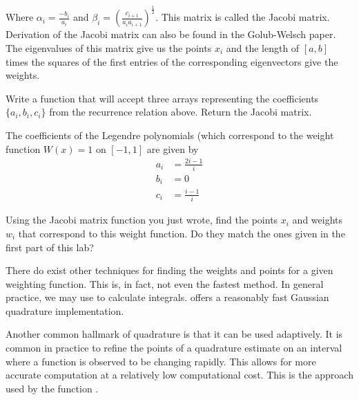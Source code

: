 Where $\alpha_i = \frac{-b_i}{a_i}$ and $\beta_i = (\frac{c_{i+1}}{a_ia_{i+1}})^{\frac{1}{2}}$.
This matrix is called the Jacobi matrix.
Derivation of the Jacobi matrix can also be found in the Golub-Welsch paper.
The eigenvalues of this matrix give us the points $x_i$ and the length of $\left[a, b\right]$ times the squares of the first entries of the corresponding eigenvectors give the weights.

\begin{problem}
Write a function that will accept three arrays representing the coefficients $\{a_i, b_i, c_i\}$ from the recurrence relation above.
Return the Jacobi matrix.
\end{problem}

\begin{problem}
The coefficients of the Legendre polynomials (which correspond to the weight function $W(x) = 1$ on $[-1,1]$ are given by
\begin{align*}
a_i &= \frac{2i - 1}{i} \\
b_i &= 0 \\
c_i &= \frac{i-1}{i}
\end{align*}

Using the Jacobi matrix function you just wrote, find the points $x_i$ and weights $w_i$ that correspond to this weight function.
Do they match the ones given in the first part of this lab?

\end{problem}


There do exist other techniques for finding the weights and points for a given weighting function.
This is, in fact, not even the fastest method.
In general practice, we may use  to calculate integrals.
 offers a reasonably fast Gaussian quadrature implementation.

Another common hallmark of quadrature is that it can be used adaptively.
It is common in practice to refine the points of a quadrature estimate on an interval where a function is observed to be changing rapidly.
This allows for more accurate computation at a relatively low computational cost.
This is the approach used by the function .

